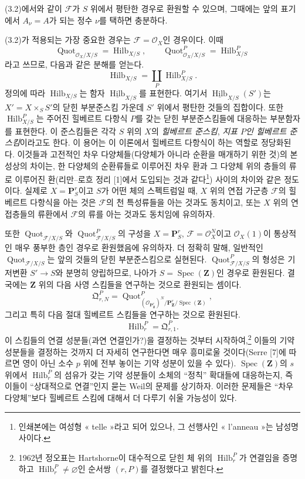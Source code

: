 (3.2)에서와 같이 $\mathcal F$가 $S$ 위에서 평탄한 경우로 환원할 수
있으며, 그때에는 앞의 표기에서 $A_\nu=A$가 되는 정수 $\nu$를 택하면
충분하다.

(3.2)가 적용되는 가장 중요한 경우는 $\mathcal F=\mathcal O_X$인
경우이다. 이때
\[
\operatorname{Quot}_{\mathcal O_X/X/S}=\operatorname{Hilb}_{X/S},
\qquad
\operatorname{Quot}^P_{\mathcal O_X/X/S}=\operatorname{Hilb}^P_{X/S}
\]
라고 쓰므로, 다음과 같은 분해를 얻는다.
\[
\operatorname{Hilb}_{X/S}=\coprod_P\operatorname{Hilb}^P_{X/S}.
\]
정의에 따라 $\operatorname{Hilb}_{X/S}$는 함자
$\underline{\operatorname{Hilb}}_{X/S}$를 표현한다. 여기서
$\underline{\operatorname{Hilb}}_{X/S}(S')$는
$X'=X\times_SS'$의 닫힌 부분준스킴 가운데 $S'$ 위에서 평탄한 것들의
집합이다. 또한 $\operatorname{Hilb}^P_{X/S}$는 주어진 힐베르트
다항식 $P$를 갖는 닫힌 부분준스킴들에 대응하는 부분함자를 표현한다.
이 준스킴들은 각각 $S$ 위의 $X$의 \emph{힐베르트 준스킴},
\emph{지표 $P$인 힐베르트 준스킴}이라고도 한다. 이 용어는 이 이론에서
힐베르트 다항식이 하는 역할로 정당화된다. 이것들과 고전적인 차우
다양체들(다양체가 아니라 순환을 매개하기 위한 것)의 본성상의 차이는,
한 다양체의 순환류들로 이루어진 차우 환과 그 다양체 위의 층들의 류로
이루어진 환(리만--로흐 정리 [1]에서 도입되는 것과
같다\footnote{인쇄본에는 여성형 « telle »라고 되어
있으나, 그 선행사인 « l'anneau »는 남성명사이다.}) 사이의 차이와 같은
정도이다. 실제로 $X=\mathbf P^r_S$이고 $S$가 어떤 체의 스펙트럼일 때,
$X$ 위의 연접 가군층 $\mathcal F$의 힐베르트 다항식을 아는 것은
$\mathcal F$의 천 특성류들을 아는 것과도 동치이고, 또는 $X$ 위의 연접층들의
류환에서 $\mathcal F$의 류를 아는 것과도 동치임에 유의하자.

 또한 $\operatorname{Quot}_{\mathcal F/X/S}$와
$\operatorname{Quot}^P_{\mathcal F/X/S}$의 구성을
$X=\mathbf P^r_S$, $\mathcal F=\mathcal O_X^N$이고
$\mathcal O_X(1)$이 통상적인 매우 풍부한 층인 경우로 환원했음에
유의하자. 더 정확히 말해, 일반적인
$\operatorname{Quot}_{\mathcal F/X/S}$는 앞의 것들의 닫힌
부분준스킴으로 실현된다. $\operatorname{Quot}^P_{\mathcal F/X/S}$의
형성은 기저변환 $S'\longrightarrow S$와 분명히 양립하므로, 나아가
$S=\operatorname{Spec}(\mathbf Z)$인 경우로 환원된다. 결국에는
$\mathbf Z$ 위의 다음 사영 스킴들을 연구하는 것으로 환원되는 셈이다.
\[
\mathfrak Q^P_{r,N}=
\operatorname{Quot}^{P}_{(\mathcal O_{\mathbf P^r_{\mathbf Z}})^N/
\mathbf P^r_{\mathbf Z}/\operatorname{Spec}(\mathbf Z)},
\]
그리고 특히 다음 절대 힐베르트 스킴들을 연구하는 것으로 환원된다.
\[
\operatorname{Hilb}^P_r=\mathfrak Q^P_{r,1}.
\]
이 스킴들의 연결 성분들(과연 연결인가?)을 결정하는 것부터
시작하여,\footnote{1962년 정오표는 Hartshorne이 대수적으로 닫힌 체 위의
$\operatorname{Hilb}^P_r$가 연결임을 증명하고
$\operatorname{Hilb}^P_r\neq\varnothing$인 순서쌍 $(r,P)$를 결정했다고
밝힌다.} 이들의 기약 성분들을 결정하는 것까지 더 자세히 연구한다면 매우
흥미로울 것이다(Serre [7]에 따르면 영이 아닌 소수 $p$ 위에 전부 놓이는
기약 성분이 있을 수 있다). $\operatorname{Spec}(\mathbf Z)$의
$s$ 위에서 $\operatorname{Hilb}^P_r$의 섬유가 갖는 기약 성분들이
소체의 ``정칙'' 확대들에 대응하는지, 즉 이들이 ``상대적으로 연결''인지
묻는 Weil의 문제를 상기하자. 이러한 문제들은 ``차우 다양체''보다
힐베르트 스킴에 대해서 더 다루기 쉬울 가능성이 있다.


